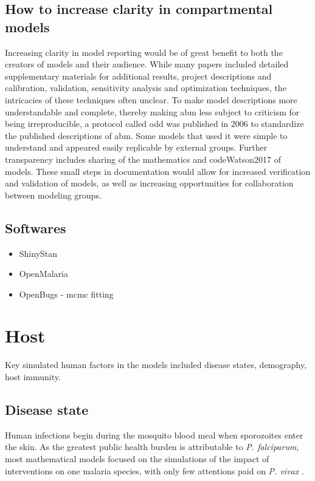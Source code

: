 \documentclass[a4paper, 12pt, twoside]{article}
\begin{document}
\subsection{How to increase clarity in compartmental models}%
\label{sub:incresing_clarity}
Increasing clarity in model reporting would be of great benefit to both the creators of models and their audience.
While many papers included detailed supplementary materials for additional results, project descriptions and calibration, validation, sensitivity analysis and optimization techniques, the intricacies of these techniques often unclear.
To make model descriptions more understandable and complete, thereby making \gls{abm} less subject to criticism for being irreproducible, a protocol called \gls{odd} \cite{Grimm2010} was published in 2006 to standardize the published descriptions of \gls{abm}.
Some models that used it \cite{Zhu2015, Zhu2015a, Watson2017} were simple to understand and appeared easily replicable by external groups.
Further transparency includes sharing of the mathematics and code{Watson2017} of models.
These small steps in documentation would allow for increased verification and validation of models, as well as increasing opportunities for collaboration between modeling groups.

\subsection{Softwares}

\begin{itemize}
	\item ShinyStan
	\item OpenMalaria
  \item OpenBugs - \gls{mcmc} fitting \cite{Lunn2009}
\end{itemize}

\section{Host}%
\label{sec:Host}

Key simulated human factors in the models included disease states, demography, host immunity.

\subsection{Disease state}
Human infections begin during the mosquito blood meal when sporozoites enter the skin.
As the greatest public health burden is attributable to \textit{P. falciparum}, most mathematical models focused on the simulations of the impact of interventions on one malaria species, with only few attentions paid on \textit{P. vivax} \cite{White2018b} .
\end{document}
